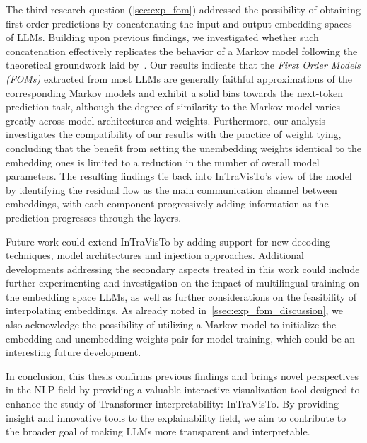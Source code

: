 The third research question (\cref{sec:exp_fom}) addressed the possibility of obtaining first-order predictions by concatenating the input and output embedding spaces of LLMs.
Building upon previous findings, we investigated whether such concatenation effectively replicates the behavior of a Markov model following the theoretical groundwork laid by~\citet{elhage2021}.
Our results indicate that the \emph{First Order Models (FOMs)} extracted from most LLMs are generally faithful approximations of the corresponding Markov models and exhibit a solid bias towards the next-token prediction task, although the degree of similarity to the Markov model varies greatly across model architectures and weights.
Furthermore, our analysis investigates the compatibility of our results with the practice of weight tying, concluding that the benefit from setting the unembedding weights identical to the embedding ones is limited to a reduction in the number of overall model parameters.
The resulting findings tie back into InTraVisTo's view of the model by identifying the residual flow as the main communication channel between embeddings, with each component progressively adding information as the prediction progresses through the layers.

Future work could extend InTraVisTo by adding support for new decoding techniques, model architectures and injection approaches.
Additional developments addressing the secondary aspects treated in this work could include further experimenting and investigation on the impact of multilingual training on the embedding space LLMs, as well as further considerations on the feasibility of interpolating embeddings.
As already noted in~\cref{ssec:exp_fom_discussion}, we also acknowledge the possibility of utilizing a Markov model to initialize the embedding and unembedding weights pair for model training, which could be an interesting future development.

In conclusion, this thesis confirms previous findings and brings novel perspectives in the NLP field by providing a valuable interactive visualization tool designed to enhance the study of Transformer interpretability: InTraVisTo.
By providing insight and innovative tools to the explainability field, we aim to contribute to the broader goal of making LLMs more transparent and interpretable.
